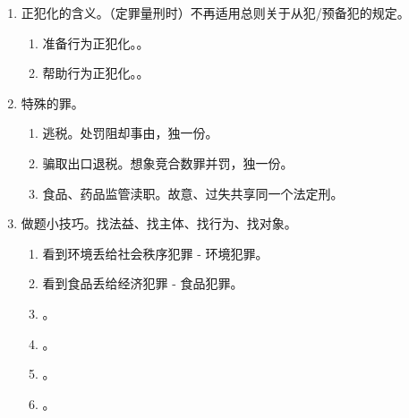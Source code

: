 \begin{enumerate}
\begin{enumerate}
          \item 他人。一定要排除“合法”所有、占有本尊。
          \item {}。
        \end{enumerate}
  \item 正犯化的含义。（定罪量刑时）不再适用总则关于从犯/预备犯的规定。
        \begin{enumerate}
          \item 准备行为正犯化。。
          \item 帮助行为正犯化。。
        \end{enumerate}
  \item 特殊的罪。
        \begin{enumerate}
          \item 逃税。处罚阻却事由，独一份。
          \item 骗取出口退税。想象竞合数罪并罚，独一份。
          \item 食品、药品监管渎职。故意、过失共享同一个法定刑。
        \end{enumerate}
  \item 做题小技巧。找法益、找主体、找行为、找对象。
        \begin{enumerate}
          \item 看到环境丢给社会秩序犯罪 - 环境犯罪。
          \item 看到食品丢给经济犯罪 - 食品犯罪。
          \item {}。
          \item {}。
          \item {}。
          \item {}。
        \end{enumerate}
\end{enumerate}
